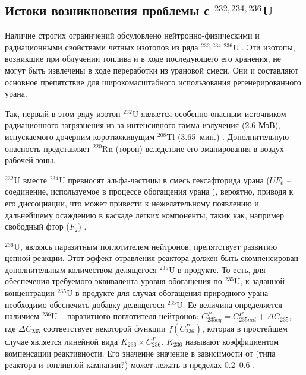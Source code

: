\subsection{Истоки возникновения проблемы с $^{232,234,236}$U}

Наличие строгих ограничений обсуловлено нейтронно-физическими и радиационными свойствами четных изотопов из ряда $^{232,234,236}$U \cite{smirnovEvolutionIsotopicComposition2012, proselkovAnalizVozmozhnostiIspolzovaniya2003, dudnikovInfluence236UEfficacy2016}. Эти изотопы, возникшие при облучении топлива и в ходе последующего его хранения, не могут быть извлечены в ходе переработки из урановой смеси. Они и составляют основное препятствие для широкомасштабного использования регенерированного урана.

Так, первый в этом ряду изотоп $^{232}$U является особенно опасным источником радиационного загрязнения из-за интенсивного гамма-излучения (2.6 МэВ), испускаемого дочерним короткоживущим $^{208}$Tl (3.65 мин.) \cite{matveevUran232EgoVliyanie1985,abbasProliferationResistanceFeatures2013}. Дополнительную опасность представляет $^{220}$Rn (торон) вследствие его эманирования в воздух рабочей зоны.

$^{232}$U вместе $^{234}$U превносят альфа-частицы в смесь гексафторида урана ($UF_6$ -- соединение, используемое в процессе обогащения урана \cite{orlovWayObtainUranium2015, orlovDesublimationPurificationTransporting2017}), вероятно, приводя к его диссоциации, что может привести к нежелательному появлению и дальнейшему осаждению в каскаде легких компоненты, такик как, например свободный фтор ($F_2$) \cite{kryuchkovObogashchennyyUranDobavleniem2007, bernhardtRadiationEffectsAlpha1958, shmelevRazrabotkaRaschetnoyModeli2012}.

$^{236}$U, являясь паразитным поглотителем нейтронов, препятствует развитию цепной реакции. Этот эффект отравления реактора должен быть скомпенсирован дополнительным количеством делящегося $^{235}$U в продукте. То есть, для обеспечения требуемого эквивалента уровня обогащения по $^{235}$U, к заданной концентрации $^{235}$U в продукте для случая обогащения природного урана необходимо обеспечить добавку делящегося $^{235}$U. Ее величина определяется наличием $^{236}$U -- паразитного  поглотителя нейтронов:
$C_{235 e q}^{P}=C_{235 n a t}^{P}+\Delta C_{235}$, где $\Delta C_{235}$ соответствует некоторой функции $f\left(C_{236}^{P}\right)$, которая в простейшем случае является линейной вида $K_{236} \times C_{236}^{P}$. $K_{236}$ называют коэффициентом компенсации реактивности. Его значение значение в зависимости от (типа реактора и топливной кампании?) может лежать в пределах 0.2--0.6 \cite{delagarzaMulticomponentIsotopeSeparation1961, delculAnalysisReuseUranium2009}. 

